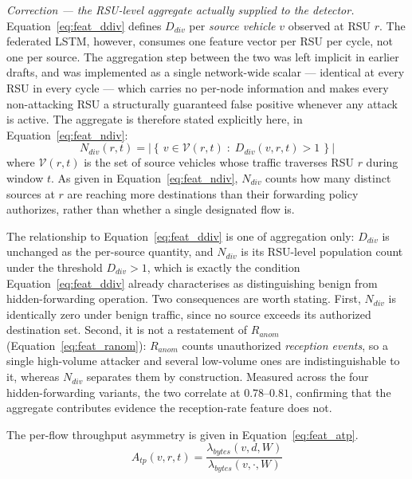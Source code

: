 \documentclass[12pt, a4paper]{report}
\begin{document}
\textit{Correction --- the \ac{RSU}-level aggregate actually
supplied to the detector.}
Equation~\eqref{eq:feat_ddiv} defines $D_{div}$ per
\emph{source vehicle} $v$ observed at \ac{RSU} $r$. The
federated \ac{LSTM}, however, consumes one feature vector per
\ac{RSU} per cycle, not one per source. The aggregation step
between the two was left implicit in earlier drafts, and was
implemented as a single network-wide scalar --- identical at
every \ac{RSU} in every cycle --- which carries no
per-node information and makes every non-attacking \ac{RSU} a
structurally guaranteed false positive whenever any attack is
active. The aggregate is therefore stated explicitly here, in
Equation~\eqref{eq:feat_ndiv}:
\begin{equation}
N_{div}(r,t) =
\left|\left\{\,
v \in \mathcal{V}(r,t) \;:\;
D_{div}(v,r,t) > 1
\,\right\}\right|
\label{eq:feat_ndiv}
\end{equation}
where $\mathcal{V}(r,t)$ is the set of source vehicles whose
traffic traverses \ac{RSU} $r$ during window $t$. As given in
Equation~\eqref{eq:feat_ndiv}, $N_{div}$ counts how many
distinct sources at $r$ are reaching more destinations than
their forwarding policy authorizes, rather than whether a
single designated flow is.

The relationship to Equation~\eqref{eq:feat_ddiv} is one of
aggregation only: $D_{div}$ is unchanged as the per-source
quantity, and $N_{div}$ is its \ac{RSU}-level population count
under the threshold $D_{div}>1$, which is exactly the condition
Equation~\eqref{eq:feat_ddiv} already characterises as
distinguishing benign from hidden-forwarding operation. Two
consequences are worth stating. First, $N_{div}$ is identically
zero under benign traffic, since no source exceeds its
authorized destination set. Second, it is not a restatement of
$R_{anom}$ (Equation~\eqref{eq:feat_ranom}): $R_{anom}$ counts
unauthorized \emph{reception events}, so a single high-volume
attacker and several low-volume ones are indistinguishable to
it, whereas $N_{div}$ separates them by construction. Measured
across the four hidden-forwarding variants, the two correlate
at $0.78$--$0.81$, confirming that the aggregate contributes
evidence the reception-rate feature does not.

The per-flow throughput asymmetry is given in
Equation~\eqref{eq:feat_atp}.
\begin{equation}
A_{tp}(v,r,t) =
\frac{\lambda_{bytes}(v,d,W)}
{\lambda_{bytes}(v,\cdot,W)}
\label{eq:feat_atp}
\end{equation}
\end{document}
